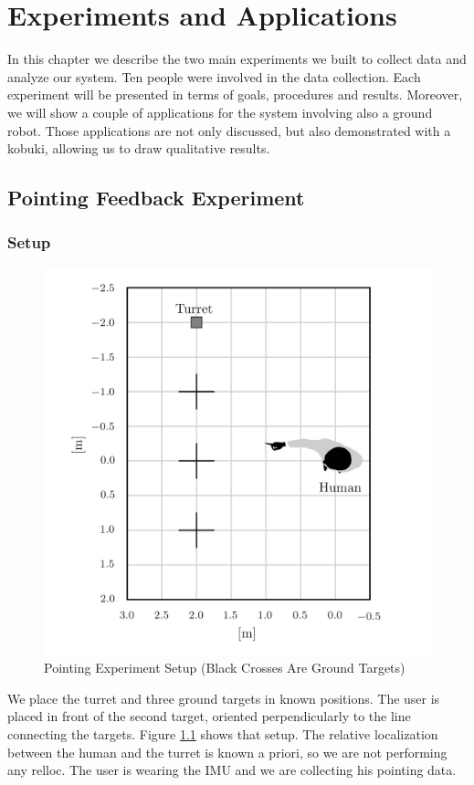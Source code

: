 \chapter{Experiments and Applications}\label{chap:4}
In this chapter we describe the two main experiments we built to collect data and analyze our system. Ten people were involved in the data collection. Each experiment will be presented in terms of goals, procedures and results. Moreover, we will show a couple of applications for the system involving also a ground robot. Those applications are not only discussed, but also demonstrated with a kobuki, allowing us to draw qualitative results.
\section{Pointing Feedback Experiment}
\subsection{Setup}
\begin{figure}
	\centering
	\includegraphics[width=\textwidth]{img/pointingExpSetup.png}%
	\caption{Pointing Experiment Setup (Black Crosses Are Ground Targets)}
	\label{fig:pointingExpSetup}
\end{figure}
We place the turret and three ground targets in known positions. The user is placed in front of the second target, oriented perpendicularly to the line connecting the targets. Figure \ref{fig:pointingExpSetup} shows that setup. The relative localization between the human and the turret is known a priori, so we are not performing any \ac{relloc}. The user is wearing the \ac{IMU} and we are collecting his pointing data.\\

